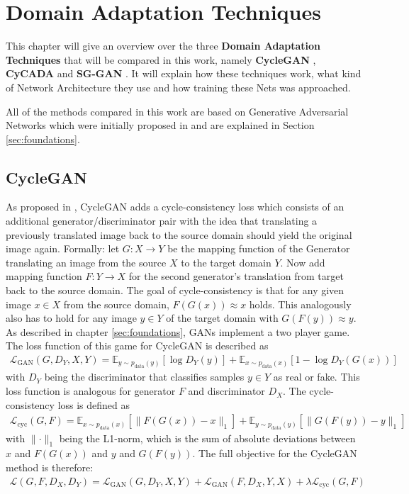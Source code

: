 \chapter{Domain Adaptation Techniques}
\label{sec:techniques}

This chapter will give an overview over the three \textbf{Domain Adaptation Techniques} that will be compared in this work, namely \textbf{CycleGAN} \cite{DBLP:journals/corr/ZhuPIE17}, \textbf{CyCADA} \cite{DBLP:journals/corr/abs-1711-03213} and \textbf{SG-GAN} \cite{DBLP:journals/corr/abs-1801-01726}. It will explain how these techniques work, what kind of Network Architecture they use and how training these Nets was approached.

All of the methods compared in this work are based on Generative Adversarial Networks which were initially proposed in \cite{NIPS2014_5423} and are explained in Section \ref{sec:foundations}.\\
\section{CycleGAN} 
As proposed in \cite{DBLP:journals/corr/ZhuPIE17}, CycleGAN adds a cycle-consistency loss which consists of an additional generator/discriminator pair with the idea that translating a previously translated image back to the source domain should yield the original image again. Formally: let $G: X \rightarrow Y$ be the mapping function of the Generator translating an image from the source $X$ to the target domain $Y$. Now add mapping function $F: Y \rightarrow X$ for the second generator's translation from target back to the source domain. The goal of cycle-consistency is that for any given image $x\in X$ from the source domain, $F(G(x)) \approx x$ holds. This analogously also has to hold for any image $y \in Y$ of the target domain with $G(F(y)) \approx y$. As described in chapter \ref{sec:foundations}, GANs implement a two player game. The loss function of this game for CycleGAN is described as
\begin{align}
	\mathcal{L}_{\text{GAN}}(G, D_Y, X, Y) = \mathbb{E}_{y\sim p_{\text{data}}(y)}[\log D_Y(y)] + \mathbb{E}_{x\sim p_{\text{data}}(x)}[1 - \log D_Y(G(x))]
\end{align}
with $D_Y$ being the discriminator that classifies samples $y \in Y$ as real or fake. This loss function is analogous for generator $F$ and discriminator $D_X$. The cycle-consistency loss is defined as
\begin{align}
	\mathcal{L}_{\text{cyc}}(G, F) =  \mathbb{E}_{x\sim p_{\text{data}}(x)} [\lVert F(G(x))- x \rVert_1] + \mathbb{E}_{y\sim p_{\text{data}}(y)} [\lVert G(F(y))- y \rVert_1] \label{eq:GAN_loss}
\end{align}
with $\lVert \cdot \rVert_1$ being the L1-norm, which is the sum of absolute deviations between $x$ and $F(G(x))$ and $y$ and $G(F(y))$. The full objective for the CycleGAN method is therefore:
\begin{align}
	\mathcal{L}(G,F,D_X,D_Y) = \mathcal{L}_{\text{GAN}}(G, D_Y, X, Y) + \mathcal{L}_{\text{GAN}}(F, D_X, Y, X) + \lambda \mathcal{L}_{\text{cyc}}(G, F) \label{eq:CycleGAN_loss}
\end{align}

